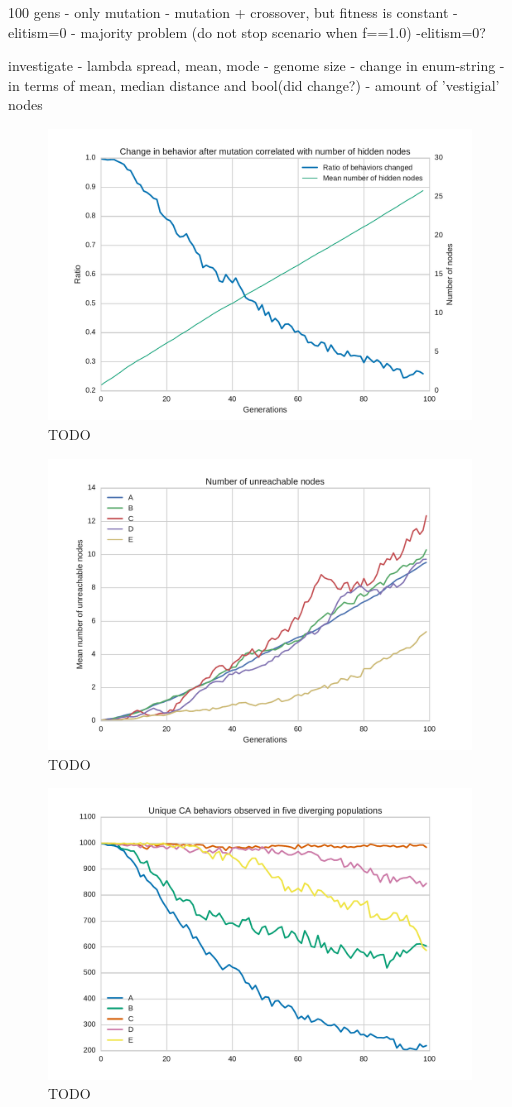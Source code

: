 100 gens
    - only mutation
    - mutation + crossover, but fitness is constant
        -elitism=0
    - majority problem (do not stop scenario when f==1.0)
        -elitism=0?

investigate
    - lambda spread, mean, mode
    - genome size
    - change in enum-string
        - in terms of mean, median distance and bool(did change?)
    - amount of 'vestigial' nodes

\begin{figure}
\centering
\includegraphics[width=\columnwidth]{fig/mutation_behavior_change}
\caption{TODO}
\end{figure}

\begin{figure}
\centering
\includegraphics[width=\columnwidth]{fig/vestigial_nodes}
\caption{TODO}
\end{figure}

\begin{figure}
\centering
\includegraphics[width=\columnwidth]{fig/unique_behaviors}
\caption{TODO}
\end{figure}

